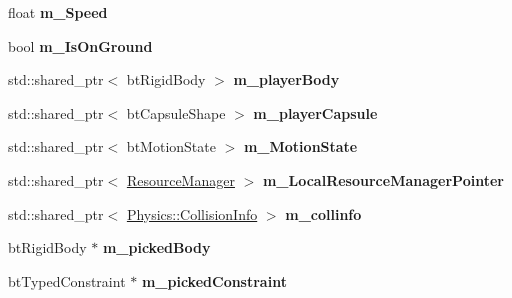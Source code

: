 \begin{DoxyCompactItemize}
\item 
float {\bfseries m\+\_\+\+Speed}\hypertarget{class_game_1_1_player_a4c71daedf7bd3485d76c1cb70b7f27ce}{}\label{class_game_1_1_player_a4c71daedf7bd3485d76c1cb70b7f27ce}

\item 
bool {\bfseries m\+\_\+\+Is\+On\+Ground}\hypertarget{class_game_1_1_player_a4dc57222dc1e9247bfd19a7cdc9c0fe4}{}\label{class_game_1_1_player_a4dc57222dc1e9247bfd19a7cdc9c0fe4}

\item 
std\+::shared\+\_\+ptr$<$ bt\+Rigid\+Body $>$ {\bfseries m\+\_\+player\+Body}\hypertarget{class_game_1_1_player_a911813ba62a58e47edf2f1817dff17fa}{}\label{class_game_1_1_player_a911813ba62a58e47edf2f1817dff17fa}

\item 
std\+::shared\+\_\+ptr$<$ bt\+Capsule\+Shape $>$ {\bfseries m\+\_\+player\+Capsule}\hypertarget{class_game_1_1_player_a0ff046e1d523e4aa29cddaeb8ca3a85c}{}\label{class_game_1_1_player_a0ff046e1d523e4aa29cddaeb8ca3a85c}

\item 
std\+::shared\+\_\+ptr$<$ bt\+Motion\+State $>$ {\bfseries m\+\_\+\+Motion\+State}\hypertarget{class_game_1_1_player_a05827ead977591a04553205769e1aecf}{}\label{class_game_1_1_player_a05827ead977591a04553205769e1aecf}

\item 
std\+::shared\+\_\+ptr$<$ \hyperlink{class_resource_manager}{Resource\+Manager} $>$ {\bfseries m\+\_\+\+Local\+Resource\+Manager\+Pointer}\hypertarget{class_game_1_1_player_a63863d1b8aa07e194d5d4188031d6918}{}\label{class_game_1_1_player_a63863d1b8aa07e194d5d4188031d6918}

\item 
std\+::shared\+\_\+ptr$<$ \hyperlink{class_physics_1_1_collision_info}{Physics\+::\+Collision\+Info} $>$ {\bfseries m\+\_\+collinfo}\hypertarget{class_game_1_1_player_aeced903f6d135a6b3eb0675fbfcf1b6a}{}\label{class_game_1_1_player_aeced903f6d135a6b3eb0675fbfcf1b6a}

\item 
bt\+Rigid\+Body $\ast$ {\bfseries m\+\_\+picked\+Body}\hypertarget{class_game_1_1_player_abc902ef3e954fa600b981caf19f83047}{}\label{class_game_1_1_player_abc902ef3e954fa600b981caf19f83047}

\item 
bt\+Typed\+Constraint $\ast$ {\bfseries m\+\_\+picked\+Constraint}\hypertarget{class_game_1_1_player_a0f404419ffe9be67113db1f7b4daaa38}{}\label{class_game_1_1_player_a0f404419ffe9be67113db1f7b4daaa38}


\end{DoxyCompactItemize}
